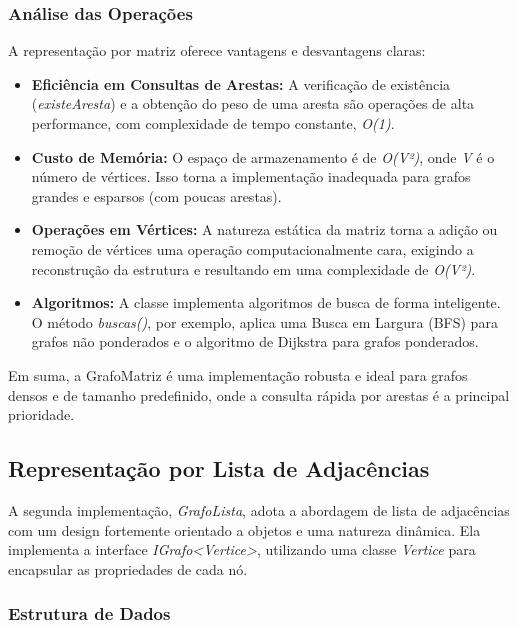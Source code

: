 \documentclass{sbc2023}%
\begin{document}
        \subsubsection{Análise das Operações}
    
        A representação por matriz oferece vantagens e desvantagens claras:
    
        \begin{itemize}
            \item \textbf{Eficiência em Consultas de Arestas:} A verificação de existência (\textit{existeAresta}) e a obtenção do peso de uma aresta são operações de alta performance, com complexidade de tempo constante, \textit{O(1)}.
            \item \textbf{Custo de Memória:} O espaço de armazenamento é de \textit{O(V²)}, onde \textit{V} é o número de vértices. Isso torna a implementação inadequada para grafos grandes e esparsos (com poucas arestas).
            \item \textbf{Operações em Vértices:} A natureza estática da matriz torna a adição ou remoção de vértices uma operação computacionalmente cara, exigindo a reconstrução da estrutura e resultando em uma complexidade de \textit{O(V²)}.
            \item \textbf{Algoritmos:} A classe implementa algoritmos de busca de forma inteligente. O método \textit{buscas()}, por exemplo, aplica uma Busca em Largura (BFS) para grafos não ponderados e o algoritmo de Dijkstra para grafos ponderados.
        \end{itemize}
    
        Em suma, a GrafoMatriz é uma implementação robusta e ideal para grafos densos e de tamanho predefinido, onde a consulta rápida por arestas é a principal prioridade.

    \subsection{Representação por Lista de Adjacências}
    
    A segunda implementação, \textit{GrafoLista}, adota a abordagem de lista de adjacências com um design fortemente orientado a objetos e uma natureza dinâmica. Ela implementa a interface \textit{IGrafo<Vertice>}, utilizando uma classe \textit{Vertice} para encapsular as propriedades de cada nó.

        \subsubsection{Estrutura de Dados}
    
\end{document}
